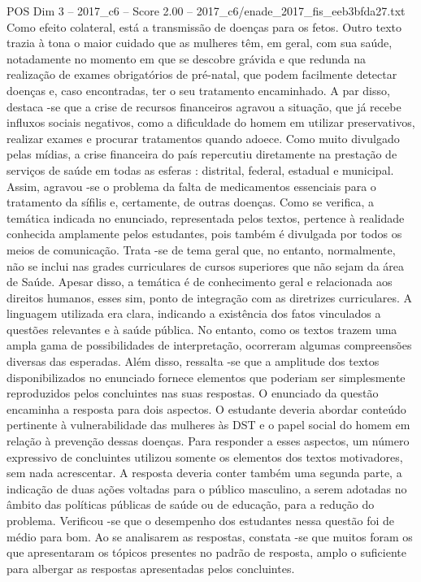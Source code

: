 \begin{textsample}{POS Dim 3 – 2017\_c6 – Score 2.00 – 2017\_c6/enade\_2017\_fis\_eeb3bfda27.txt}
Como efeito colateral, está a transmissão de doenças para os fetos.
Outro texto trazia à tona o maior cuidado que as mulheres têm, em geral, com sua saúde, notadamente no momento em que se descobre grávida e que redunda na realização de exames obrigatórios de pré-natal, que podem facilmente detectar doenças e, caso encontradas, ter o seu tratamento encaminhado.
A par disso, destaca -se que a crise de recursos financeiros agravou a situação, que já recebe influxos sociais negativos, como a dificuldade do homem em utilizar preservativos, realizar exames e procurar tratamentos quando adoece.
Como muito divulgado pelas mídias, a crise financeira do país repercutiu diretamente na prestação de serviços de saúde em todas as esferas : distrital, federal, estadual e municipal.
Assim, agravou -se o problema da falta de medicamentos essenciais para o tratamento da sífilis e, certamente, de outras doenças.
Como se verifica, a temática indicada no enunciado, representada pelos textos, pertence à realidade conhecida amplamente pelos estudantes, pois também é divulgada por todos os meios de comunicação.
Trata -se de tema geral que, no entanto, normalmente, não se inclui nas grades curriculares de cursos superiores que não sejam da área de Saúde.
Apesar disso, a temática é de conhecimento geral e relacionada aos direitos humanos, esses sim, ponto de integração com as diretrizes curriculares.
A linguagem utilizada era clara, indicando a existência dos fatos vinculados a questões relevantes e à saúde pública.
No entanto, como os textos trazem uma ampla gama de possibilidades de interpretação, ocorreram algumas compreensões diversas das esperadas.
Além disso, ressalta -se que a amplitude dos textos disponibilizados no enunciado fornece elementos que poderiam ser simplesmente reproduzidos pelos concluintes nas suas respostas.
O enunciado da questão encaminha a resposta para dois aspectos.
O estudante deveria abordar conteúdo pertinente à vulnerabilidade das mulheres às DST e o papel social do homem em relação à prevenção dessas doenças.
Para responder a esses aspectos, um número expressivo de concluintes utilizou somente os elementos dos textos motivadores, sem nada acrescentar.
A resposta deveria conter também uma segunda parte, a indicação de duas ações voltadas para o público masculino, a serem adotadas no âmbito das políticas públicas de saúde ou de educação, para a redução do problema.
Verificou -se que o desempenho dos estudantes nessa questão foi de médio para bom.
Ao se analisarem as respostas, constata -se que muitos foram os que apresentaram os tópicos presentes no padrão de resposta, amplo o suficiente para albergar as respostas apresentadas pelos concluintes.

\end{textsample}
